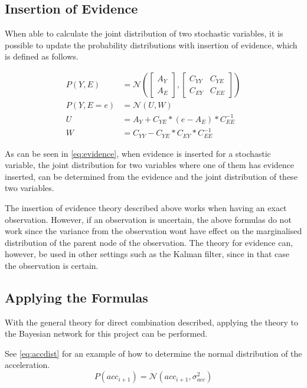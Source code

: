 \subsection{Insertion of Evidence}\label{section:insert-evidence}
When able to calculate the joint distribution of two stochastic variables, it is possible to update the probability distributions with insertion of evidence, which is defined as follows.

\begin{equation}\label{eq:evidence}
\begin{aligned}
P(Y,E) &= \mathcal{N}\left(\begin{bmatrix} A_Y \\ A_E\end{bmatrix}, \begin{bmatrix}C_{YY} & C_{YE} \\ C_{EY} & C_{EE}\end{bmatrix}\right) \\
P(Y,E=e) &= \mathcal{N}\left(U,W\right) \\
U &= A_Y + C_{YE} * (e - A_E) * C_{EE}^{-1} \\
W &= C_{YY} - C_{YE} * C_{EY} * C_{EE}^{-1}
\end{aligned}
\end{equation}

As can be seen in \eqref{eq:evidence}, when evidence is inserted for a stochastic variable, the joint distribution for two variables where one of them has evidence inserted, can be determined from the evidence and the joint distribution of these two variables.

The insertion of evidence theory described above works when having an exact observation. 
However, if an observation is uncertain, the above formulas do not work since the variance from the observation wont have effect on the marginalised distribution of the parent node of the observation.
The theory for evidence can, however, be used in other settings such as the Kalman filter, since in that case the observation is certain.

\subsection{Applying the Formulas}
With the general theory for direct combination described, applying the theory to the Bayesian network for this project can be performed.

See \eqref{eq:accdist} for an example of how to determine the normal distribution of the acceleration.
\begin{equation}\label{eq:accdist}
P(acc_{i+1})=\mathcal{N}(acc_{i+1},\sigma^2_{acc})
\end{equation}

